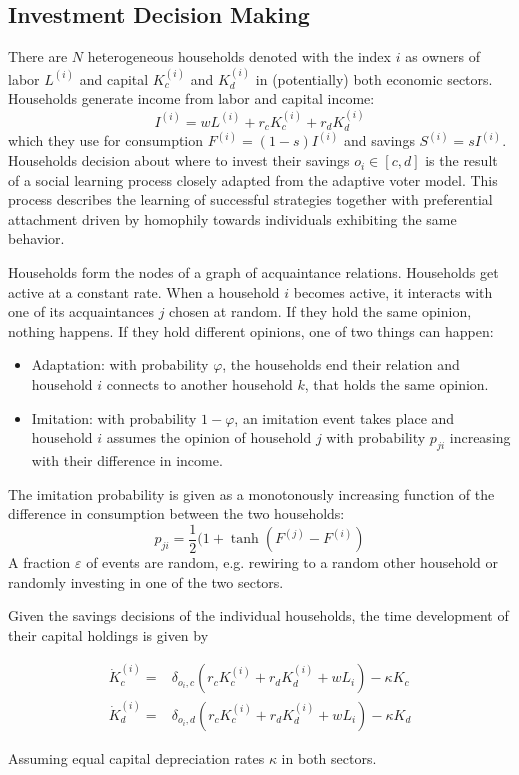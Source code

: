 \subsection{Investment Decision Making}

There are $N$ heterogeneous households denoted with the index $i$ as owners of labor $L^{(i)}$ and capital $K_c^{(i)}$ and $K_d^{(i)}$ in (potentially) both economic sectors.
Households generate income from labor and capital income:
\begin{equation}
	I^{(i)} = w L^{(i)} + r_c K_c^{(i)} + r_d K_d^{(i)}
	\label{household_income}
\end{equation}
which they use for consumption $F^{(i)} = (1-s) I^{(i)}$ and savings $S^{(i)} = s I^{(i)}$. Households decision about where to invest their savings $o_i \in [c,d]$ is the result of a social learning process closely adapted from the adaptive voter model. This process describes the learning of successful strategies together with preferential attachment driven by homophily towards individuals exhibiting the same behavior.

Households form the nodes of a graph of acquaintance relations. Households get active at a constant rate. When a household $i$ becomes active, it interacts with one of its acquaintances $j$ chosen at random. If they hold the same opinion, nothing happens. If they hold different opinions, one of two things can happen:
\begin{itemize}
	\item Adaptation: with probability $\varphi$, the households end their relation and household $i$ connects to another household $k$, that holds the same opinion. 
	\item Imitation: with probability $1-\varphi$, an imitation event takes place and household $i$ assumes the opinion of household $j$ with probability $p_{ji}$ increasing with their difference in income.
\end{itemize}
The imitation probability is given as a monotonously increasing function of the difference in consumption between the two households:
\begin{equation}
	p_{ji} = \frac{1}{2}(1 + \tanh \left( F^{(j)} - F^{(i)}  \right)
	\label{imitation_probability}
\end{equation}
A fraction $\varepsilon$ of events are random, e.g. rewiring to a random other household or randomly investing in one of the two sectors.

Given the savings decisions of the individual households, the time development of their capital holdings is given by

\begin{align}
	\dot{K}_c^{(i)} =& \delta_{o_i, c} \left( r_c K_c^{(i)} + r_d K_d^{(i)} + w L_i \right) - \kappa K_c \\
	\dot{K}_d^{(i)} =& \delta_{o_i, d} \left( r_c K_c^{(i)} + r_d K_d^{(i)} + w L_i \right) - \kappa K_d 
\end{align}

Assuming equal capital depreciation rates $\kappa$ in both sectors.
